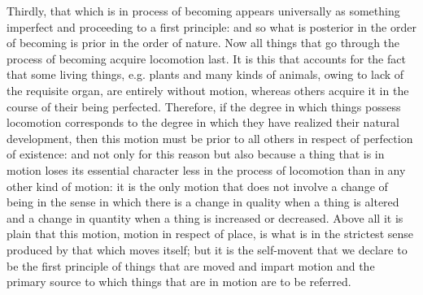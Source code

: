Thirdly, that which is in process of becoming appears universally
as something imperfect and proceeding to a first principle: and so
what is posterior in the order of becoming is prior in the order of
nature. Now all things that go through the process of becoming acquire
locomotion last. It is this that accounts for the fact that some living
things, e.g. plants and many kinds of animals, owing to lack of the
requisite organ, are entirely without motion, whereas others acquire
it in the course of their being perfected. Therefore, if the degree
in which things possess locomotion corresponds to the degree in which
they have realized their natural development, then this motion must
be prior to all others in respect of perfection of existence: and
not only for this reason but also because a thing that is in motion
loses its essential character less in the process of locomotion than
in any other kind of motion: it is the only motion that does not involve
a change of being in the sense in which there is a change in quality
when a thing is altered and a change in quantity when a thing is increased
or decreased. Above all it is plain that this motion, motion in respect
of place, is what is in the strictest sense produced by that which
moves itself; but it is the self-movent that we declare to be the
first principle of things that are moved and impart motion and the
primary source to which things that are in motion are to be referred.

